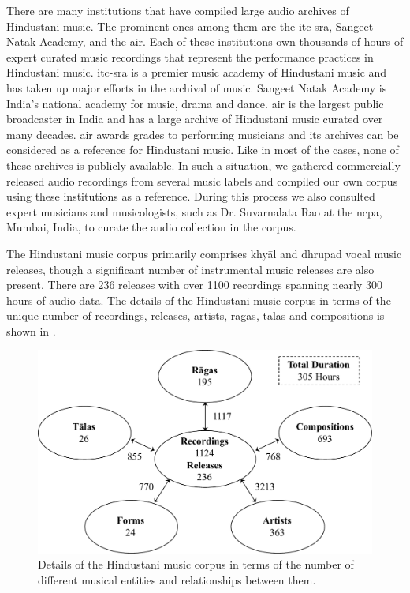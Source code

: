 There are many institutions that have compiled large audio archives of Hindustani music. The prominent ones among them are the \gls{itc-sra}, Sangeet Natak Academy, and the \gls{air}. Each of these institutions own thousands of hours of expert curated music recordings that represent the performance practices in Hindustani music. \gls{itc-sra} is a premier music academy of Hindustani music and has taken up major efforts in the archival of music. Sangeet Natak Academy is India’s national academy for music, drama and dance. \gls{air} is the largest public broadcaster in India and has a large archive of Hindustani music curated over many decades. \gls{air} awards grades to performing musicians and its archives can be considered as a reference for Hindustani music. Like in most of the cases, none of these archives is publicly available. In such a situation, we gathered commercially released audio recordings from several music labels and compiled our own corpus using these institutions as a reference. During this process we also consulted expert musicians and musicologists, such as Dr. Suvarnalata Rao at the \gls{ncpa}, Mumbai, India, to curate the audio collection in the corpus. 

The Hindustani music corpus primarily comprises khy\={a}l and dhrupad vocal music releases, though a significant number of instrumental music releases are also present. There are 236 releases with over 1100 recordings spanning nearly 300 hours of audio data. The details of the Hindustani music corpus in terms of the unique number of recordings, releases, artists, \glspl{raga}, \glspl{tala} and compositions is shown in .


\begin{figure}
	\begin{center}
		\includegraphics[width=\figSizeNinety]{ch04_datasets/figures/hindustani_corpus_main.pdf}
	\end{center}
	\caption[Details of the Hindustani music corpus]{Details of the Hindustani music corpus in terms of the number of different musical entities and relationships between them.}
	\label{fig:hindustani_corpus_details}
\end{figure}


